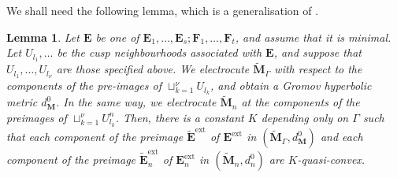 \documentclass{amsart}
\newtheorem{lemma}[theorem]{Lemma}
\theoremstyle{definition}
\begin{document}
We shall need the following lemma, which is a generalisation of \cite[Lemma 2.25]{mahan-red}.

\begin{lemma}
\label{quasi-convex}
Let $\mathbf E$ be one of $\mathbf E_1, \dots , \mathbf E_s; \mathbf F_1, \dots , \mathbf F_t$, and assume that it is minimal.
Let $U_{l_1}, \dots$ be the cusp neighbourhoods associated with  $\mathbf E$, and suppose that $U_{l_1}, \dots , U_{l_\nu}$ are those specified above.
We electrocute $\widetilde{\mathbf M}_\Gamma$ with respect to the components of the pre-images of $\sqcup_{k=1}^\nu U_{l_k}$, and obtain a Gromov hyperbolic metric $d^0_{\mathbf M}$.
In the same way, we electrocute $\widetilde{\mathbf M}_n$ at the components of the preimages of $\sqcup_{k=1}^\nu U^n_{l_k}$.
Then, there is a constant $K$ depending only on $\Gamma$ such that each component of the preimage $\widetilde{\mathbf E}^\mathrm{ext}$ of $\mathbf E^\mathrm{ext}$   in  $(\widetilde{\mathbf M}_\Gamma, d^0_{\mathbf M})$ and each component of the preimage  $\widetilde{\mathbf E}^\mathrm{ext}_n$ of $\mathbf E^\mathrm{ext}_n$ in $(\widetilde{\mathbf M}_n, d^0_n)$ are $K$-quasi-convex.
\end{lemma}
\end{document}
